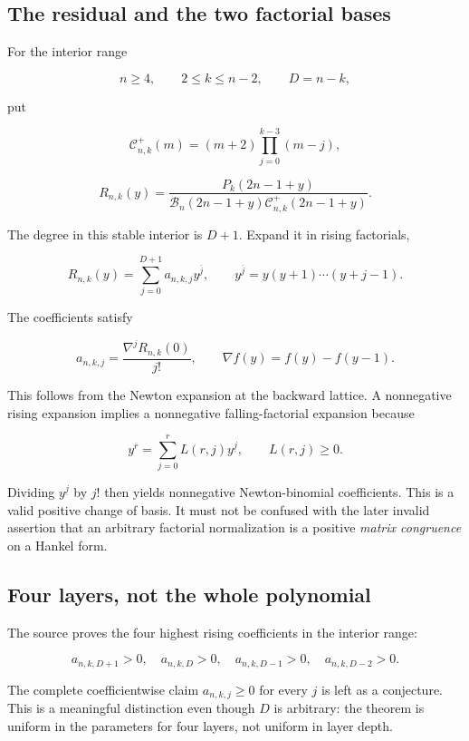 \documentclass[
  10pt,
  a4paper,
  10pt,
  oneside,
  openany]{book}
\begin{document}
\subsection{The residual and the two factorial
bases}\label{the-residual-and-the-two-factorial-bases}

For the interior range

\[
 n\ge4,\qquad2\le k\le n-2,\qquad D=n-k,
\]

put

\[
 \mathcal C^+_{n,k}(m)=(m+2)\prod_{j=0}^{k-3}(m-j),
\]

\[
 R_{n,k}(y)=
 \frac{P_k(2n-1+y)}{
 \mathcal B_n(2n-1+y)\mathcal C^+_{n,k}(2n-1+y)}.
 \tag{27.1}\label{eq:27.1}
\]

The degree in this stable interior is \(D+1\). Expand it in rising
factorials,

\[
 R_{n,k}(y)=\sum_{j=0}^{D+1}a_{n,k,j}y^{\overline j},
 \qquad y^{\overline j}=y(y+1)\cdots(y+j-1).
 \tag{27.2}\label{eq:27.2}
\]

The coefficients satisfy

\[
 a_{n,k,j}=\frac{\nabla^jR_{n,k}(0)}{j!},
 \qquad\nabla f(y)=f(y)-f(y-1).
\]

This follows from the Newton expansion at the backward lattice. A
nonnegative rising expansion implies a nonnegative falling-factorial
expansion because

\[
 y^{\overline r}=\sum_{j=0}^rL(r,j)y^{\underline j},
 \qquad L(r,j)\ge0.
 \tag{27.3}\label{eq:27.3}
\]

Dividing \(y^{\underline j}\) by \(j!\) then yields nonnegative
Newton-binomial coefficients. This is a valid positive change of basis.
It must not be confused with the later invalid assertion that an
arbitrary factorial normalization is a positive \emph{matrix congruence}
on a Hankel form.

\subsection{Four layers, not the whole
polynomial}\label{four-layers-not-the-whole-polynomial}

The source proves the four highest rising coefficients in the interior
range:

\[
 a_{n,k,D+1}>0,\quad a_{n,k,D}>0,\quad
 a_{n,k,D-1}>0,\quad a_{n,k,D-2}>0.
 \tag{27.4}\label{eq:27.4}
\]

The complete coefficientwise claim \(a_{n,k,j}\ge0\) for every \(j\) is
left as a conjecture. This is a meaningful distinction even though \(D\)
is arbitrary: the theorem is uniform in the parameters for four layers,
not uniform in layer depth.
\end{document}
